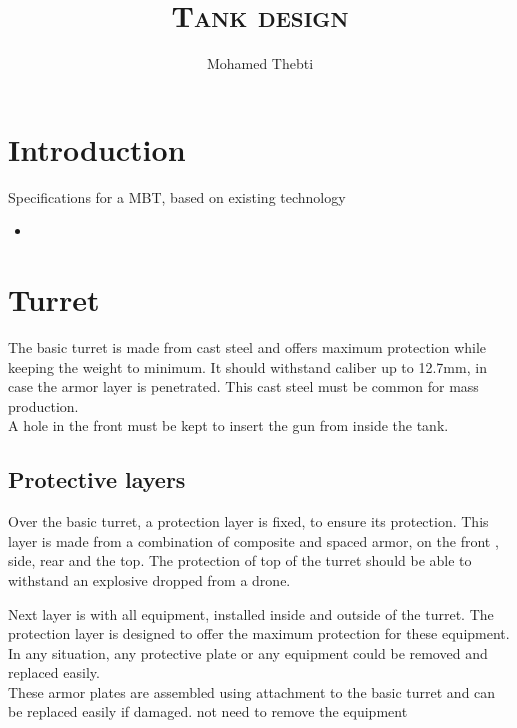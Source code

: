 \documentclass[12pt,a4paper]{article}
\title{
	\Huge\textsc{Tank design}
}
\author{Mohamed Thebti}
\begin{document}
\setlength{\parindent}{0mm}

\fancyhead[R]{\slshape \leftmark}

\fancyfoot[C]{}
\fancyfoot[R]{\thepage}

\maketitle
\newpage

\tableofcontents

\newpage

\section{Introduction}

Specifications for a MBT, based on existing technology


\begin{itemize}
	\item 
\end{itemize}
\newpage

\section{Turret}
The basic turret is made from cast steel and offers maximum protection while keeping the weight to minimum. It should withstand caliber up to 12.7mm, in case the armor layer is penetrated. This cast steel must be common for mass production.
\\
A hole in the front must be kept to insert the gun from inside the tank. 
\\
\subsection{Protective layers}
Over the basic turret, a  protection layer is fixed, to ensure its protection. This layer is made from a combination of composite and spaced armor, on the front , side, rear and the top. 
The protection of top of the turret should be able to withstand an explosive dropped from a drone. 

Next layer is with all equipment, installed inside and outside of the turret. The protection layer is designed to offer the maximum protection for these equipment. In any situation, any protective plate or any equipment could be removed and replaced easily. 
\\
These armor plates are assembled using attachment to the basic turret
and can be replaced easily if damaged.
not need to remove the equipment
\end{document}
